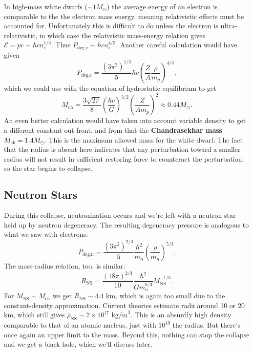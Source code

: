 \documentclass[../a062main.tex]{subfiles}
\begin{document}
In high-mass white dwarfs ($\sim 1M_\odot$) the average energy of an electron is comparable to the the electron mass energy, meaning relativistic effects must be accounted for.
Unfortunately this is difficult to do unless the electron is ultra-relativistic, in which case the relativistic mass-energy relation gives $\mathcal{E} = pc \sim \hbar c n_e^{1 / 3}$.
Thus $P_\textrm{deg,e} \sim \hbar c n_e^{4 / 3}$.
Another careful calculation would have given
\[ P_\textrm{deg,e} = \frac{(3\pi^2)^{1 / 3}}{5} \hbar c \left( \frac{Z}{A} \frac{\rho}{m_p} \right)^{4 / 3}, \]
which we could use with the equation of hydrostatic equilibrium to get
\[ M_\textrm{ch} = \frac{3 \sqrt{2\pi}}{8} \left( \frac{\hbar c}{G} \right)^{3 / 2} \left( \frac{Z}{A m_p} \right)^2 \approx 0.44M_\odot. \]
An even better calculation would have taken into account variable density to get a different constant out front, and from that the \textbf{Chandrasekhar mass} $M_\textrm{ch} = 1.4 M_\odot$.
This is the maximum allowed mass for the white dwarf.
The fact that the radius is absent here indicates that any perturbation toward a smaller radius will not result in sufficient restoring force to counteract the perturbation, so the star begins to collapse.

\subsection*{Neutron Stars}
During this collapse, neutronization occurs and we're left with a neutron star held up by neutron degeneracy.
The resulting degeneracy pressure is analogous to what we saw with electrons:
\[ P_\textrm{deg,n} = \frac{(3\pi^2)^{2 / 3}}{5} \frac{\hbar^2}{m_n} \left( \frac{\rho}{m_n} \right)^{5 / 3}. \]
The mass-radius relation, too, is similar:
\[ R_\textrm{NS} = \frac{(18\pi)^{2 / 3}}{10} \frac{\hbar^2}{G m_n^{8 / 3}} M_\textrm{NS}^{-1 / 3}. \]
For $M_\textrm{NS} \sim M_\textrm{ch}$ we get $R_\textrm{NS} \sim 4.4 \text{ km}$, which is again too small due to the constant-density approximation.
Current theories estimate radii around 10 or 20 km, which still gives $\overline{\rho}_\textrm{NS} \sim 7 \times 10^{17} \text{ kg/m}^3$.
This is an absurdly high density comparable to that of an atomic nucleus, just with $10^{19}$ the radius.
But there's once again an upper limit to the mass.
Beyond this, nothing can stop the collapse and we get a black hole, which we'll discuss later.
\end{document}
